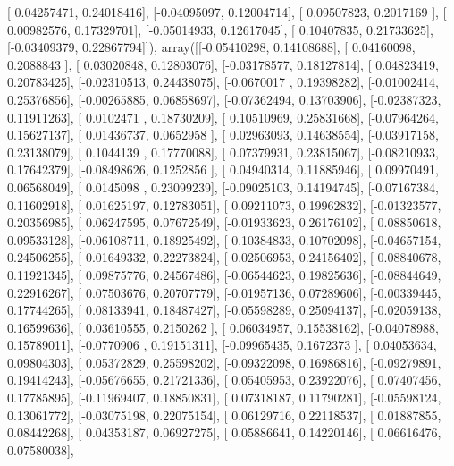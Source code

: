 \documentclass{article}
\begin{document}
       [ 0.04257471,  0.24018416],
       [-0.04095097,  0.12004714],
       [ 0.09507823,  0.2017169 ],
       [ 0.00982576,  0.17329701],
       [-0.05014933,  0.12617045],
       [ 0.10407835,  0.21733625],
       [-0.03409379,  0.22867794]]), array([[-0.05410298,  0.14108688],
       [ 0.04160098,  0.2088843 ],
       [ 0.03020848,  0.12803076],
       [-0.03178577,  0.18127814],
       [ 0.04823419,  0.20783425],
       [-0.02310513,  0.24438075],
       [-0.0670017 ,  0.19398282],
       [-0.01002414,  0.25376856],
       [-0.00265885,  0.06858697],
       [-0.07362494,  0.13703906],
       [-0.02387323,  0.11911263],
       [ 0.0102471 ,  0.18730209],
       [ 0.10510969,  0.25831668],
       [-0.07964264,  0.15627137],
       [ 0.01436737,  0.0652958 ],
       [ 0.02963093,  0.14638554],
       [-0.03917158,  0.23138079],
       [ 0.1044139 ,  0.17770088],
       [ 0.07379931,  0.23815067],
       [-0.08210933,  0.17642379],
       [-0.08498626,  0.1252856 ],
       [ 0.04940314,  0.11885946],
       [ 0.09970491,  0.06568049],
       [ 0.0145098 ,  0.23099239],
       [-0.09025103,  0.14194745],
       [-0.07167384,  0.11602918],
       [ 0.01625197,  0.12783051],
       [ 0.09211073,  0.19962832],
       [-0.01323577,  0.20356985],
       [ 0.06247595,  0.07672549],
       [-0.01933623,  0.26176102],
       [ 0.08850618,  0.09533128],
       [-0.06108711,  0.18925492],
       [ 0.10384833,  0.10702098],
       [-0.04657154,  0.24506255],
       [ 0.01649332,  0.22273824],
       [ 0.02506953,  0.24156402],
       [ 0.08840678,  0.11921345],
       [ 0.09875776,  0.24567486],
       [-0.06544623,  0.19825636],
       [-0.08844649,  0.22916267],
       [ 0.07503676,  0.20707779],
       [-0.01957136,  0.07289606],
       [-0.00339445,  0.17744265],
       [ 0.08133941,  0.18487427],
       [-0.05598289,  0.25094137],
       [-0.02059138,  0.16599636],
       [ 0.03610555,  0.2150262 ],
       [ 0.06034957,  0.15538162],
       [-0.04078988,  0.15789011],
       [-0.0770906 ,  0.19151311],
       [-0.09965435,  0.1672373 ],
       [ 0.04053634,  0.09804303],
       [ 0.05372829,  0.25598202],
       [-0.09322098,  0.16986816],
       [-0.09279891,  0.19414243],
       [-0.05676655,  0.21721336],
       [ 0.05405953,  0.23922076],
       [ 0.07407456,  0.17785895],
       [-0.11969407,  0.18850831],
       [ 0.07318187,  0.11790281],
       [-0.05598124,  0.13061772],
       [-0.03075198,  0.22075154],
       [ 0.06129716,  0.22118537],
       [ 0.01887855,  0.08442268],
       [ 0.04353187,  0.06927275],
       [ 0.05886641,  0.14220146],
       [ 0.06616476,  0.07580038],
\end{document}
